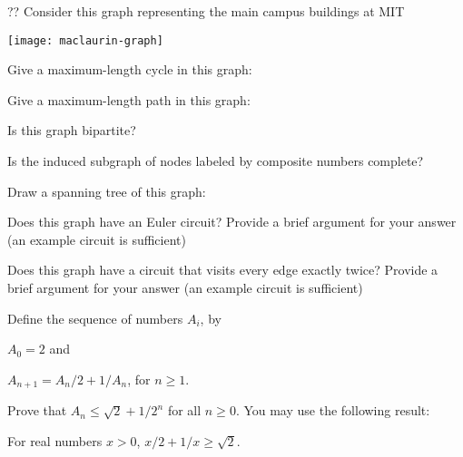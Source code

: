\documentclass[12pt,oneside]{article}
\begin{document}
%
\begin{problem}{??}
Consider this graph representing the main campus buildings at MIT

\vspace{12pt}
\centerline{\texttt{[image: maclaurin-graph]}}
\vspace{12pt}

\bparts

 Give a maximum-length cycle in this graph:

 Give a maximum-length path in this graph: 

 Is this graph bipartite?

 Is the induced subgraph of nodes labeled by composite numbers complete?

 Draw a spanning tree of this graph:
\vspace {1in}
\solution{}

 Does this graph have an Euler circuit? Provide a brief argument for your answer (an example circuit is sufficient)

 Does this graph have a circuit that visits every edge exactly twice?
Provide a brief argument for your answer (an example circuit is sufficient)
\solution{}

\eparts
\end{problem}


\begin{problem}{15}
Define the sequence of numbers $A_i$, by

$A_0=2$ and

$A_{n+1}=A_n/2 + 1/A_n$, for $n\geq1$.

Prove that $A_n\leq \sqrt{2}+1/2^n$ for all $n\geq 0$. You may use the following result:

\begin{lemma*} For real numbers $x>0$, $x/2+1/x\geq \sqrt{2}$.
\end{lemma*}

\end{problem}
\end{document}

